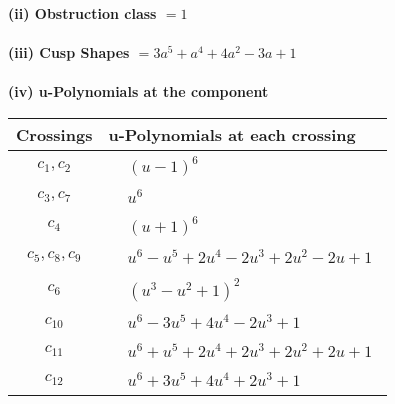\documentclass[1p]{elsarticle_modified}
\theoremstyle{definition}
\begin{document}
\flushleft \textbf{(ii) Obstruction class $= 1$}\\~\\
\flushleft \textbf{(iii) Cusp Shapes $= 3 a^5+a^4+4 a^2-3 a+1$}\\~\\
\newpage\renewcommand{\arraystretch}{1}
\flushleft \textbf{(iv) u-Polynomials at the component}\newline \\
\begin{tabular}{m{50pt}|m{274pt}}
Crossings & \hspace{64pt}u-Polynomials at each crossing \\
\hline $$\begin{aligned}c_{1},c_{2}\end{aligned}$$&$\begin{aligned}
&(u-1)^6
\end{aligned}$\\
\hline $$\begin{aligned}c_{3},c_{7}\end{aligned}$$&$\begin{aligned}
&u^6
\end{aligned}$\\
\hline $$\begin{aligned}c_{4}\end{aligned}$$&$\begin{aligned}
&(u+1)^6
\end{aligned}$\\
\hline $$\begin{aligned}c_{5},c_{8},c_{9}\end{aligned}$$&$\begin{aligned}
&u^6- u^5+2 u^4-2 u^3+2 u^2-2 u+1
\end{aligned}$\\
\hline $$\begin{aligned}c_{6}\end{aligned}$$&$\begin{aligned}
&(u^3- u^2+1)^2
\end{aligned}$\\
\hline $$\begin{aligned}c_{10}\end{aligned}$$&$\begin{aligned}
&u^6-3 u^5+4 u^4-2 u^3+1
\end{aligned}$\\
\hline $$\begin{aligned}c_{11}\end{aligned}$$&$\begin{aligned}
&u^6+u^5+2 u^4+2 u^3+2 u^2+2 u+1
\end{aligned}$\\
\hline $$\begin{aligned}c_{12}\end{aligned}$$&$\begin{aligned}
&u^6+3 u^5+4 u^4+2 u^3+1
\end{aligned}$\\
\hline
\end{tabular}\\~\\
\end{document}
